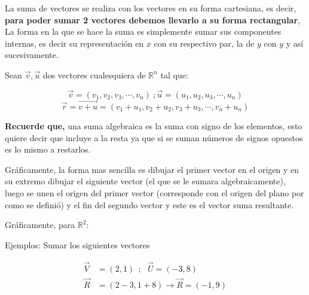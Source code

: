     La suma de vectores se realiza con los vectores en su forma cartesiana, es
    decir,\textbf{ para poder sumar 2 vectores debemos llevarlo a su forma
    rectangular}, La forma en la que se hace la suma es simplemente sumar sus
    componentes internas, es decir su representación en $x$ con su respectivo
    par, la de $y$ con $y$ y así sucesivamente.

    Sean $\vec{v},\vec{u}$ dos vectores cualesquiera de $\mathbb{R}^n$ tal que:

    $$\vec{v}=(v_1,v_2,v_3,\cdots,v_n)\ ; \vec{u}=(u_1,u_2,u_3,\cdots,u_n)$$
    $$\vec{r}=\vec{v+u}=(v_1+u_1,v_2+u_2,v_3+u_3,\cdots,v_n+u_n)$$

    \textbf{Recuerde que,} una suma algebraica es la suma con signo de los
    elementos, esto quiere decir que incluye a la resta ya que si se suman
    números de signos opuestos es lo mismo a restarlos.

    Gráficamente, la forma mas sencilla es dibujar el primer vector en el
    origen y en su extremo dibujar el siguiente vector (el que se le sumara
    algebraicamente), luego se unen el origen del primer vector (corresponde
    con el origen del plano por como se definió) y el fin del segundo vector
    y este es el vector suma resultante.

    Gráficamente, para $\mathbb{R}^2$:



    Ejemplos: Sumar los siguientes vectores

    \begin{align*}
        \vec{V}& =(2,1) \ \ ;\ \ \ \vec{U} =(-3,8)		\\
        \vec{R}&= (2-3 ,1+8 )   \rightarrow \vec{R} = (-1 ,9  )
    \end{align*}

